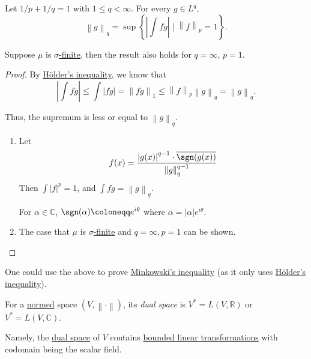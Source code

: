 \begin{proposition}\label{prop:Lp-dual-formula}
	Let \(1/p + 1/q = 1\) with \(1 \leq q < \infty\). For every \(g \in L^q\),
	\[
		\left\lVert g\right\rVert_q = \sup\left\{\left\vert \int fg \right\vert  \mid \left\lVert f\right\rVert_p = 1\right\}.
	\]

	Suppose \(\mu \) is \hyperref[def:sigma-finite-measure]{\(\sigma\)-finite}, then the result also holds for \(q = \infty\), \(p = 1\).
\end{proposition}
\begin{proof}
	By \hyperref[thm:Holder-inequality]{Hölder's inequality}, we know that
	\[
		\left\vert \int fg \right\vert  \leq \int \left\vert fg \right\vert  = \left\lVert fg\right\rVert_1 \leq \left\lVert f\right\rVert _p \left\lVert g\right\rVert_q = \left\lVert g\right\rVert_q.
	\]

	Thus, the supremum is less or equal to \(\left\lVert g\right\rVert_q\).

	\begin{enumerate}[(1)]
		\item Let
		      \[
			      f(x) = \frac{\left\vert g(x) \right\vert ^{q-1}\cdot \overline{\sgn(g(x))}}{\left\lVert g\right\rVert_q^{q-1}}
		      \]
		      Then \(\int \left\vert f \right\vert ^p = 1\), and \(\int fg = \left\lVert g\right\rVert _q\).
		      \begin{note}
			      For \(\alpha \in \mathbb{C}\), \(\sgn (\alpha) \coloneqq e^{i\theta}\) where \(\alpha = \left\vert \alpha \right\vert e^{i\theta}\).
		      \end{note}
		\item The case that \(\mu\) is \hyperref[def:sigma-finite-measure]{\(\sigma\)-finite} and \(q = \infty, p = 1\) can be shown.
	\end{enumerate}
\end{proof}

\begin{remark}
	One could use the above to prove \hyperref[thm:Minkowski-inequality]{Minkowski's inequality} (as it only uses \hyperref[thm:Holder-inequality]{Hölder's inequality}).
\end{remark}

\begin{definition}\label{def:dual-space}
	For a \hyperref[def:norm]{normed} space \((V, \left\lVert \cdot\right\rVert )\), its \emph{dual space} is \(V^\ast = L(V, \mathbb{R} )\) or
	\(V^\ast = L(V, \mathbb{C})\).
\end{definition}
\begin{remark}
	Namely, the \hyperref[def:dual-space]{dual space} of \(V\) contains \hyperref[def:bounded-linear-transformation]{bounded linear transformations} with codomain being the scalar field.
\end{remark}

